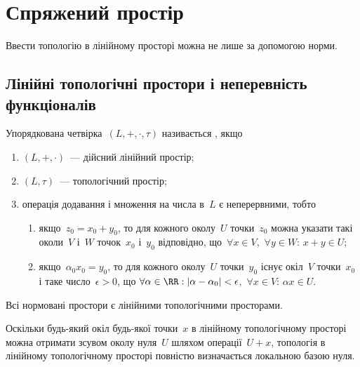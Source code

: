 \chapter{Спряжений простір}

Ввести топологію в лінійному просторі можна не лише за допомогою норми.

\section{Лінійні топологічні простори і неперевність функціоналів}

\begin{definition}
    Упорядкована четвірка~$(L, +, \cdot, \tau)$ називається , якщо
    \begin{enumerate}
        \item $(L, +, \cdot)$~--- дійсний лінійний простір;
        \item $(L, \tau)$~--- топологічний простір;
        \item операція додавання і множення на числа в~$L$ є
        неперервними, тобто
        \begin{enumerate}
            \item якщо~$z_0 = x_0 + y_0$, то для кожного околу~$U$ точки~$z_0$
            можна указати такі околи~$V$ і~$W$ точок~$x_0$ і~$y_0$ відповідно,
            що~$\forall x \in V$,~$\forall y \in W$: $x + y \in U$;
            \item якщо~$\alpha_0 x_0 = y_0$, то для кожного околу~$U$ точки~$y_0$
            існує окіл~$V$ точки~$x_0$ і таке число~$\epsilon > 0$, що
            $\forall \alpha \in \RR: |\alpha - \alpha_0| < \epsilon$,~$\forall x \in V$: $\alpha x \in U$.
        \end{enumerate}
    \end{enumerate}
\end{definition}

\begin{example}
    Всі нормовані простори є лінійними топологічними просторами.
\end{example}

\begin{remark}
    Оскільки будь-який окіл будь-якої точки~$x$ в лінійному топологічному просторі можна отримати зсувом околу нуля~$U$ шляхом операції~$U + x$, топологія в лінійному топологічному просторі повністю визначається локальною базою нуля.
\end{remark}


